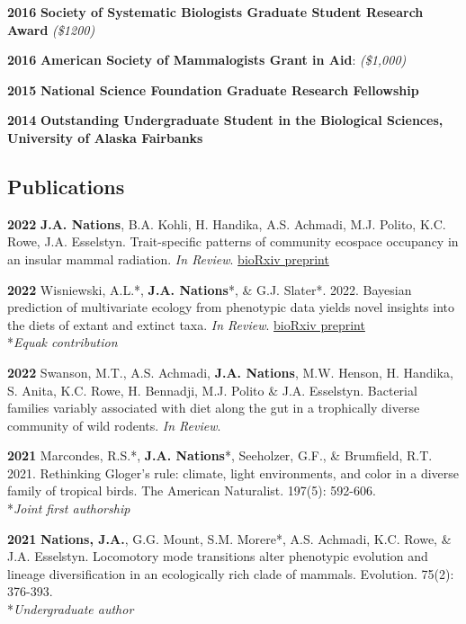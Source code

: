\documentclass[
]{article}
\begin{document}
\textbf{2016} \textbar{} \textbf{Society of Systematic Biologists
Graduate Student Research Award} \emph{(\$1200)}

\textbf{2016} \textbar{} \textbf{American Society of Mammalogists Grant
in Aid}: \emph{(\$1,000)}

\textbf{2015} \textbar{} \textbf{National Science Foundation Graduate
Research Fellowship}

\textbf{2014} \textbar{} \textbf{Outstanding Undergraduate Student in
the Biological Sciences, University of Alaska Fairbanks}

\hypertarget{publications}{%
\subsection{Publications}\label{publications}}

\textbf{2022} \textbar{} \textbf{J.A. Nations}, B.A. Kohli, H. Handika,
A.S. Achmadi, M.J. Polito, K.C. Rowe, J.A. Esselstyn. Trait-specific
patterns of community ecospace occupancy in an insular mammal radiation.
\emph{In Review}.
\href{https://www.biorxiv.org/content/10.1101/2022.07.15.500274v1}{bioRxiv
preprint}

\textbf{2022} \textbar{} Wisniewski, A.L.*, \textbf{J.A. Nations}*, \&
G.J. Slater*. 2022. Bayesian prediction of multivariate ecology from
phenotypic data yields novel insights into the diets of extant and
extinct taxa. \emph{In Review}.
\href{https://www.biorxiv.org/content/10.1101/2022.05.05.490807v1}{bioRxiv
preprint}\\
*\emph{Equak contribution}

\textbf{2022} \textbar{} Swanson, M.T., A.S. Achmadi, \textbf{J.A.
Nations}, M.W. Henson, H. Handika, S. Anita, K.C. Rowe, H. Bennadji,
M.J. Polito \& J.A. Esselstyn. Bacterial families variably associated
with diet along the gut in a trophically diverse community of wild
rodents. \emph{In Review}.

\textbf{2021} \textbar{} Marcondes, R.S.*, \textbf{J.A. Nations}*,
Seeholzer, G.F., \& Brumfield, R.T. 2021. Rethinking Gloger's rule:
climate, light environments, and color in a diverse family of tropical
birds. The American Naturalist. 197(5): 592-606.\\
*\emph{Joint first authorship}

\textbf{2021} \textbar{} \textbf{Nations, J.A.}, G.G. Mount, S.M.
Morere*, A.S. Achmadi, K.C. Rowe, \& J.A. Esselstyn. Locomotory mode
transitions alter phenotypic evolution and lineage diversification in an
ecologically rich clade of mammals. Evolution. 75(2): 376-393.\\
*\emph{Undergraduate author}
\end{document}
